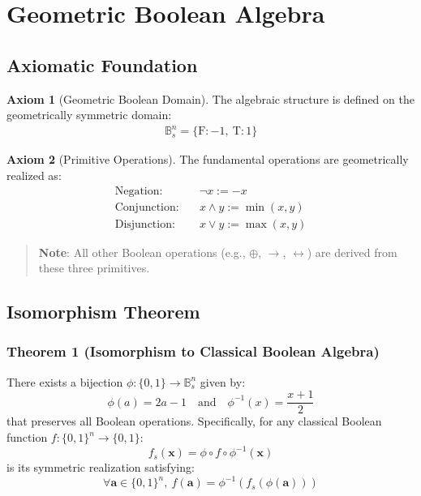 \documentclass{article}
\begin{document}
\section{Geometric Boolean Algebra}

\subsection{Axiomatic Foundation}
\textbf{Axiom 1} (Geometric Boolean Domain).
The algebraic structure is defined on the geometrically symmetric domain:
\begin{align}
\mathbb{B}_s^n = \{ \mathrm{F} : -1,\  \mathrm{T} : 1 \}
\end{align}

\textbf{Axiom 2} (Primitive Operations).
The fundamental operations are geometrically realized as:
\begin{align}
\text{Negation:}\quad & \neg x := -x \\
\text{Conjunction:}\quad & x \land y := \min(x,y) \\
\text{Disjunction:}\quad & x \lor y := \max(x,y)
\end{align}

\begin{quote}
\textbf{Note}: All other Boolean operations (e.g., $\oplus$, $\to$, $\leftrightarrow$) are derived from these three primitives.
\end{quote}

\subsection{Isomorphism Theorem}
\subsubsection{Theorem 1 (Isomorphism to Classical Boolean Algebra)}
There exists a bijection $\phi: \{0,1\} \to \mathbb{B}_s^n$ given by:
\begin{equation}
\phi(a) = 2a - 1 \quad \text{and} \quad \phi^{-1}(x) = \frac{x + 1}{2}
\end{equation}
that preserves all Boolean operations. Specifically, for any classical Boolean function $f: \{0,1\}^n \to \{0,1\}$:
\begin{equation}
f_s(\mathbf{x}) = \phi \circ f \circ \phi^{-1}(\mathbf{x})
\end{equation}
is its symmetric realization satisfying:
\begin{equation}
\forall \mathbf{a} \in \{0,1\}^n,\ f(\mathbf{a}) = \phi^{-1}\left( f_s(\phi(\mathbf{a})) \right)
\end{equation}
\end{document}
